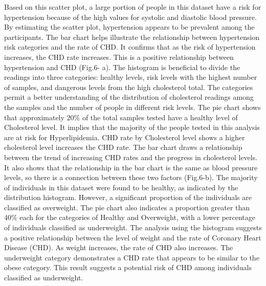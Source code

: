 \documentclass[conference]{IEEEtran}
\begin{document}
Based on this scatter plot, a large portion of people in this dataset have a risk for hypertension because of the high values for systolic and diastolic blood pressure. By estimating the scatter plot, hypertension appears to be prevalent among the participants. The bar chart helps illustrate the relationship between hypertension risk categories and the rate of CHD. It confirms that as the risk of hypertension increases, the CHD rate increases. This is a positive relationship between hypertension and CHD (Fig.6- a). The histogram is beneficial to divide the readings into three categories: healthy levels, risk levels with the highest number of samples, and dangerous levels from the high cholesterol total. The categories permit a better understanding of the distribution of cholesterol readings among the samples and the number of people in different risk levels. The pie chart shows that approximately 20\% of the total samples tested have a healthy level of Cholesterol level. It implies that the majority of the people tested in this analysis are at risk for Hyperlipidemia. CHD rate by Cholesterol level shows a higher cholesterol level increases the CHD rate. The bar chart draws a relationship between the trend of increasing CHD rates and the progress in cholesterol levels. It also shows that the relationship in the bar chart is the same as blood pressure levels, so there is a connection between these two factors (Fig.6-b). The majority of individuals in this dataset were found to be healthy, as indicated by the distribution histogram. However, a significant proportion of the individuals are classified as overweight. The pie chart also indicates a proportion greater than 40\% each for the categories of Healthy and Overweight, with a lower percentage of individuals classified as underweight. The analysis using the histogram suggests a positive relationship between the level of weight and the rate of Coronary Heart Disease (CHD). As weight increases, the rate of CHD also increases. The underweight category demonstrates a CHD rate that appears to be similar to the obese category. This result suggests a potential risk of CHD among individuals classified as underweight. 
\end{document}
